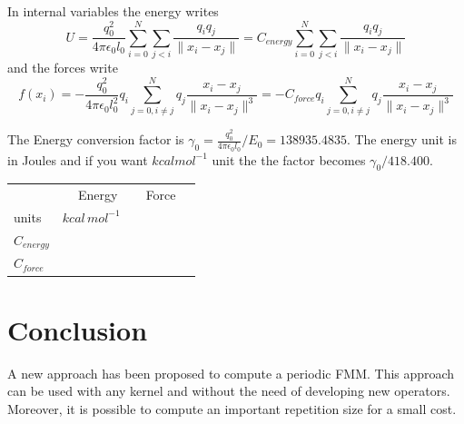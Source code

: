 \documentclass[12pt]{article} %
\begin{document}
 In internal variables the energy writes 
$$
U = \frac{q_0^2}{4 \pi\epsilon_0 l_0}\sum_{i=0}^{N}{\sum_{j<i}{\frac{q_i q_j}{\|x_i-x_j\|}}}  = C_{energy}\sum_{i=0}^{N}{\sum_{j<i}{\frac{q_i q_j}{\|x_i-x_j\|}}}
$$
and the forces write 
$$
f(x_i) = -\frac{q_0^2}{4 \pi\epsilon_0 l_0^2} q_i \sum_{j=0,i\neq j}^{N}{q_j\frac{x_i-x_j}{\|x_i-x_j\|^3}}
 = -C_{force} q_i  \sum_{j=0,i\neq j}^{N}{q_j\frac{x_i-x_j}{\|x_i-x_j\|^3}}
$$

The Energy conversion factor is $\gamma_0 = \frac{q_0^2}{4 \pi\epsilon_0 l_0}/E_0 = 138935.4835$. The energy unit is in Joules and if you want $kcal mol^{-1}$ unit the the factor becomes $\gamma_0/418.400$.
\begin{tabular}{|l|c|c|c|c|c|}
\hline
 & \multicolumn{2}{|c|}{Energy}  & \multicolumn{2}{c|}{Force} \\
units& $kcal\, mol^{-1}$& & &\\
\hline
$C_{energy}$& & & &\\
$C_{force}$& & & &\\
\hline
\end{tabular}
\section{Conclusion}
A new approach has been proposed to compute a periodic FMM.
This approach can be used with any kernel and without the need of developing new operators.
Moreover, it is possible to compute an important repetition size for a small cost.
\end{document}
